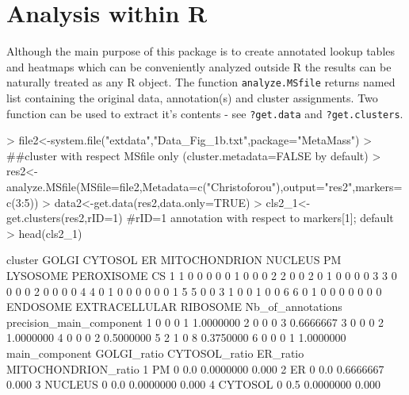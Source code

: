 \documentclass[a4paper]{article}
\numberwithin{equation}{subsection}
\begin{document}
\section{Analysis within R}
Although the main purpose of this package is to create annotated lookup
tables and heatmaps which can be conveniently analyzed outside R the
results can be naturally treated as any R object.
The function \texttt{analyze.MSfile} returns named list containing the
original data, annotation(s) and cluster assignments. Two function
can be used to extract it's contents - see \texttt{?get.data} and \texttt{?get.clusters}.
\scriptsize
\begin{Schunk}
\begin{Sinput}
> file2<-system.file("extdata","Data_Fig_1b.txt",package="MetaMass")
> ##cluster with respect MSfile only (cluster.metadata=FALSE by default)
> res2<-analyze.MSfile(MSfile=file2,Metadata=c("Christoforou"),output="res2",markers=c(3:5))
> data2<-get.data(res2,data.only=TRUE)
> cls2_1<-get.clusters(res2,rID=1) #rID=1 annotation with respect to markers[1]; default
> head(cls2_1)
\end{Sinput}
\begin{Soutput}
  cluster GOLGI CYTOSOL ER MITOCHONDRION NUCLEUS PM LYSOSOME PEROXISOME CS
1       1     0       0  0             0       0  1        0          0  0
2       2     0       0  2             0       1  0        0          0  0
3       3     0       0  0             0       2  0        0          0  0
4       4     0       1  0             0       0  0        0          0  1
5       5     0       0  3             1       0  0        1          0  0
6       6     0       1  0             0       0  0        0          0  0
  ENDOSOME EXTRACELLULAR RIBOSOME Nb_of_annotations precision_main_component
1        0             0        0                 1                1.0000000
2        0             0        0                 3                0.6666667
3        0             0        0                 2                1.0000000
4        0             0        0                 2                0.5000000
5        2             1        0                 8                0.3750000
6        0             0        0                 1                1.0000000
  main_component GOLGI_ratio CYTOSOL_ratio  ER_ratio MITOCHONDRION_ratio
1             PM           0           0.0 0.0000000               0.000
2             ER           0           0.0 0.6666667               0.000
3        NUCLEUS           0           0.0 0.0000000               0.000
4        CYTOSOL           0           0.5 0.0000000               0.000

\end{Soutput}
\end{Schunk}
\end{document}

